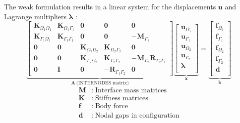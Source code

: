 \documentclass[11pt, a4paper]{article}
\begin{document}
The weak formulation results in a linear system for the displacements $\mathbf{u}$ and Lagrange multipliers $\boldsymbol{\lambda}$ \cite{voet}:
\begin{equation}
\underbrace{
\begin{bmatrix}
    \mathbf{K}_{\Omega_1\Omega_1} & \mathbf{K}_{\Omega_1\Gamma_1} & \boldsymbol{0} & \boldsymbol{0} & \boldsymbol{0} \\
    \mathbf{K}_{\Gamma_1\Omega_1} & \mathbf{K}_{\Gamma_1\Gamma_1} & \boldsymbol{0} & \boldsymbol{0} & - \mathbf{M}_{\Gamma_1} \\
    \boldsymbol{0} & \boldsymbol{0} & \mathbf{K}_{\Omega_2\Omega_2} & \mathbf{K}_{\Omega_2\Gamma_2} & \boldsymbol{0} \\
    \boldsymbol{0} & \boldsymbol{0} & \mathbf{K}_{\Gamma_2\Omega_2} & \mathbf{K}_{\Gamma_2\Gamma_2} & -\mathbf{M}_{\Gamma_2} \mathbf{R}_{\Gamma_2 \Gamma_1} \\
    \boldsymbol{0} & \boldsymbol{I} & \boldsymbol{0} & -\mathbf{R}_{\Gamma_1 \Gamma_2} & \boldsymbol{0}   
\end{bmatrix}
}_{\mathbf{A}~\text{(INTERNODES matrix)}}
\underbrace{
\begin{bmatrix}
    \mathbf{u}_{\Omega_1} \\
    \mathbf{u}_{\Gamma_1} \\
    \mathbf{u}_{\Omega_2} \\
    \mathbf{u}_{\Gamma_2} \\
    \boldsymbol{\lambda} \\
\end{bmatrix}
}_{\mathbf{x}}
=
\underbrace{
\begin{bmatrix}
    \mathbf{f}_{\Omega_1} \\
    \mathbf{f}_{\Gamma_1} \\
    \mathbf{f}_{\Omega_2} \\
    \mathbf{f}_{\Gamma_2} \\
    \mathbf{d} \\
\end{bmatrix}
}_{\mathbf{b}}
\label{equ:linear-system}
\end{equation}
\begin{align}
    \mathbf{M} &:~ \text{Interface mass matrices} \\
    \mathbf{K} &:~ \text{Stiffness matrices} \\
    \mathbf{f} &:~ \text{Body force} \\
    \mathbf{d} &:~ \text{Nodal gaps in configuration}
\end{align}
\end{document}
